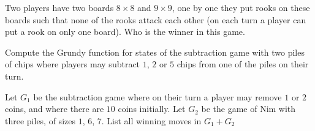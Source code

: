 \documentclass[addpoints,answers]{exam}
\begin{document}
    \pagestyle{headandfoot}
    \runningheadrule

    \firstpagefooter{}{}{}
    \runningfooter{}{}{}
    \begin{flushright}

        \vspace{0.2in}

    \end{flushright}

    \begin{questions}
        \question[10]
            Two players have two boards $8 \times 8$ and $9 \times 9$, one by one they put
            rooks on these boards such that none of the rooks attack each other (on each
            turn a player can put a rook on only one board). Who is the
            winner in this game.
            \begin{solutionorbox}[\stretch{1}]
            \end{solutionorbox}
            \newpage
        \question
            Compute the Grundy function for states of the subtraction game with two piles of
            chips where players may subtract $1$, $2$ or $5$ chips from one of the piles on
            their turn.
            \begin{solutionorbox}[\stretch{1}]
            \end{solutionorbox}
            \newpage
        \question
            Let $G_1$ be the subtraction game where on their turn a player may
            remove $1$ or $2$ coins, and where there are $10$ coins initially. Let $G_2$ be
            the game of Nim with three piles, of sizes $1$, $6$, $7$. List all winning moves
            in $G_1 + G_2$
            \begin{solutionorbox}[\stretch{1}]
            \end{solutionorbox}
            \newpage
\end{questions}
\end{document}
